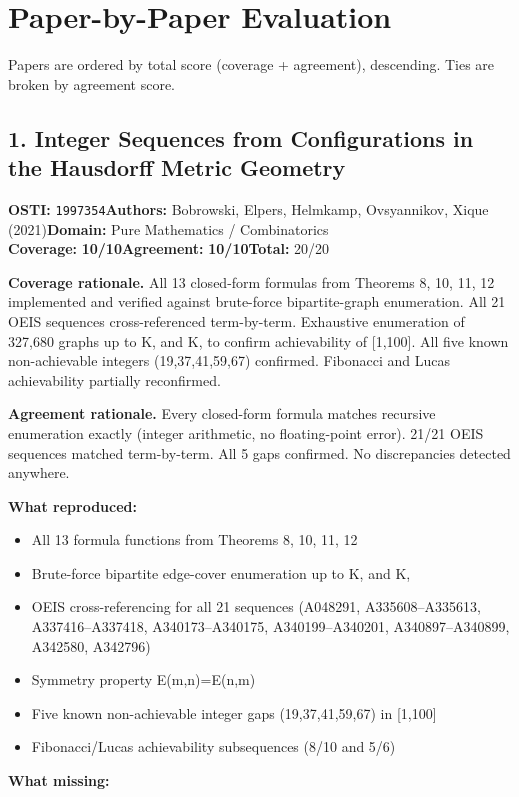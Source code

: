 \documentclass[11pt]{article}
\newcommand{\scorebadge}[2]{\textbf{#1:} \textbf{#2/10}}
\begin{document}
\clearpage
\section{Paper-by-Paper Evaluation}
Papers are ordered by total score (coverage + agreement), descending. Ties are
broken by agreement score.

\subsection{1. Integer Sequences from Configurations in the Hausdorff Metric Geometry}
\textbf{OSTI:} \texttt{1997354}\quad\textbf{Authors:} Bobrowski, Elpers, Helmkamp, Ovsyannikov, Xique (2021)\quad\textbf{Domain:} Pure Mathematics / Combinatorics\\
\scorebadge{Coverage}{10}\quad\scorebadge{Agreement}{10}\quad\textbf{Total:} 20/20\par\smallskip
\noindent\textbf{Coverage rationale.} All 13 closed-form formulas from Theorems 8, 10, 11, 12 implemented and verified against brute-force bipartite-graph enumeration. All 21 OEIS sequences cross-referenced term-by-term. Exhaustive enumeration of 327,680 graphs up to K, and K, to confirm achievability of [1,100]. All five known non-achievable integers (19,37,41,59,67) confirmed. Fibonacci and Lucas achievability partially reconfirmed.\par
\noindent\textbf{Agreement rationale.} Every closed-form formula matches recursive enumeration exactly (integer arithmetic, no floating-point error). 21/21 OEIS sequences matched term-by-term. All 5 gaps confirmed. No discrepancies detected anywhere.\par\smallskip
\noindent\textbf{What reproduced:}
\begin{itemize}[leftmargin=1.4em,itemsep=0.2em,topsep=0.2em]
\item All 13 formula functions from Theorems 8, 10, 11, 12
\item Brute-force bipartite edge-cover enumeration up to K, and K,
\item OEIS cross-referencing for all 21 sequences (A048291, A335608--A335613, A337416--A337418, A340173--A340175, A340199--A340201, A340897--A340899, A342580, A342796)
\item Symmetry property E(m,n)=E(n,m)
\item Five known non-achievable integer gaps (19,37,41,59,67) in [1,100]
\item Fibonacci/Lucas achievability subsequences (8/10 and 5/6)
\end{itemize}\noindent\textbf{What missing:}
\end{document}

